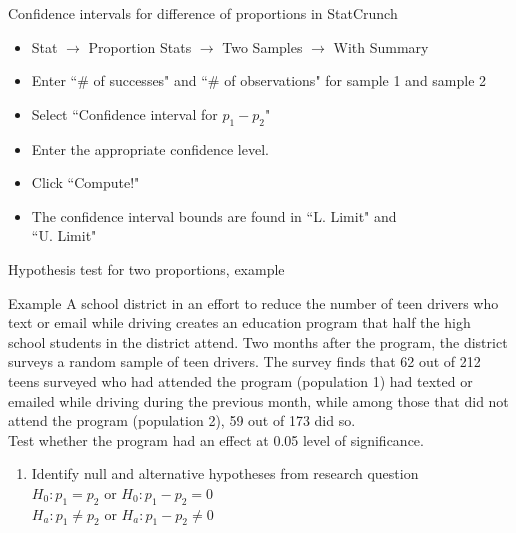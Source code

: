\documentclass[xcolor=table, handout]{beamer}
\begin{document}
\begin{frame}{Confidence intervals for difference of proportions in StatCrunch}

\begin{block}{}
\begin{itemize}
\item Stat $\to$ Proportion Stats $\to$ Two Samples $\to$ With Summary
\item Enter ``\# of successes" and ``\# of observations" for sample 1 and sample 2
\item Select ``Confidence interval for $p_1 - p_2$"
\item Enter the appropriate confidence level.
\item Click ``Compute!"
\item The confidence interval bounds are found in ``L. Limit" and\\ ``U. Limit"
\end{itemize}
\end{block}

\end{frame}

\begin{frame}{Hypothesis test for two proportions, example}
\begin{exampleblock}{Example}
\large
A school district in an effort to reduce the number of teen drivers who text or email while driving creates an education program that half the high school students in the district attend. Two months after the program, the district surveys a random sample of teen drivers. The survey finds that 62 out of 212 teens surveyed who had attended the program (population 1) had texted or emailed while driving during the previous month, while among those that did not attend the program (population 2), 59 out of 173 did so.\\
\medskip
Test whether the program had an effect at 0.05 level of significance.
\begin{enumerate}
\pause\item Identify null and alternative hypotheses from research question\\
\pause$H_0: p_1 = p_2$ or $H_0: p_1 - p_2 = 0$\\
$H_a: p_1 \ne p_2$ or $H_a: p_1 - p_2 \ne 0$\\
\end{enumerate}
\end{exampleblock}
\end{frame}
\end{document}
